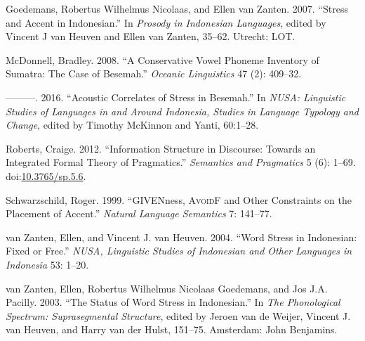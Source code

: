 \documentclass[]{article}
\begin{document}
\hypertarget{ref-goedemans2007stress}{}
Goedemans, Robertus Wilhelmus Nicolaas, and Ellen van Zanten. 2007.
``Stress and Accent in Indonesian.'' In \emph{Prosody in Indonesian
Languages}, edited by Vincent J van Heuven and Ellen van Zanten, 35--62.
Utrecht: LOT.

\hypertarget{ref-mcdonnell2008conservative}{}
McDonnell, Bradley. 2008. ``A Conservative Vowel Phoneme Inventory of
Sumatra: The Case of Besemah.'' \emph{Oceanic Linguistics} 47 (2):
409--32.

\hypertarget{ref-mcdonnell2016acoustic}{}
---------. 2016. ``Acoustic Correlates of Stress in Besemah.'' In
\emph{NUSA: Linguistic Studies of Languages in and Around Indonesia,
Studies in Language Typology and Change}, edited by Timothy McKinnon and
Yanti, 60:1--28.

\hypertarget{ref-roberts2012}{}
Roberts, Craige. 2012. ``Information Structure in Discourse: Towards an
Integrated Formal Theory of Pragmatics.'' \emph{Semantics and
Pragmatics} 5 (6): 1--69.
doi:\href{https://doi.org/10.3765/sp.5.6}{10.3765/sp.5.6}.

\hypertarget{ref-schwarzschild1999}{}
Schwarzschild, Roger. 1999. ``GIVENness, \textsc{AvoidF} and Other
Constraints on the Placement of Accent.'' \emph{Natural Language
Semantics} 7: 141--77.

\hypertarget{ref-vanzanten2004word}{}
van Zanten, Ellen, and Vincent J. van Heuven. 2004. ``Word Stress in
Indonesian: Fixed or Free.'' \emph{NUSA, Linguistic Studies of
Indonesian and Other Languages in Indonesia} 53: 1--20.

\hypertarget{ref-vanzanten2003status}{}
van Zanten, Ellen, Robertus Wilhelmus Nicolaas Goedemans, and Jos J.A.
Pacilly. 2003. ``The Status of Word Stress in Indonesian.'' In \emph{The
Phonological Spectrum: Suprasegmental Structure}, edited by Jeroen van
de Weijer, Vincent J. van Heuven, and Harry van der Hulst, 151--75.
Amsterdam: John Benjamins.
\end{document}
